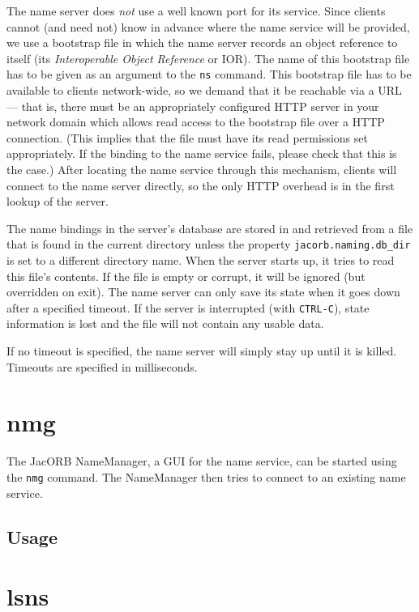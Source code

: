 \documentclass[12pt]{scrbook}
\begin{document}
The name server does {\it not}  use a well known port for its service.
Since clients  cannot (and  need not) know  in advance where  the name
service will  be provided, we use  a bootstrap file in  which the name
server records  an object reference to itself  (its {\it Interoperable
Object Reference} or  IOR). The name of this bootstrap  file has to be
given as an argument to the  {\tt ns} command. This bootstrap file has
to  be available  to clients  network-wide, so  we demand  that  it be
reachable  via a  URL  --- that  is,  there must  be an  appropriately
configured HTTP server in your network domain which allows read access
to the bootstrap  file over a HTTP connection.  (This implies that the
file must have its read  permissions set appropriately. If the binding
to the name service fails, please  check that this is the case.) After
locating the name service through this mechanism, clients will connect
to the name server directly, so the only HTTP overhead is in the first
lookup of the server.

The name bindings in the server's database are stored in and retrieved
from a file that is found in the current directory unless the property
{\tt jacorb.naming.db\_dir} is set to a different directory name. When
the server  starts up, it tries  to read this file's  contents. If the
file  is  empty or  corrupt,  it will  be  ignored  (but overridden  on
exit). The name server can only save its state when it goes down after
a specified timeout. If the server is interrupted (with {\tt CTRL-C}),
state information  is lost  and the file  will not contain  any usable
data.

If no timeout is specified, the name server will simply stay up until
it is killed. Timeouts are specified in milliseconds.

\section{nmg}

The JacORB  NameManager, a  GUI for the  name service, can  be started
using the {\tt nmg} command.  The NameManager then tries to connect to
an existing name service.

\subsection*{Usage}


\section{lsns}
\end{document}
